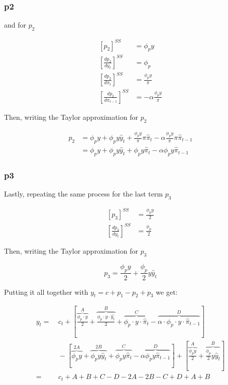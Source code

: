 \documentclass[11pt,preprint, authoryear]{elsarticle}
\numberwithin{equation}{section}
\numberwithin{figure}{section}
\numberwithin{table}{section}
\begin{document}
\hypertarget{p2}{%
\subsubsection{p2}\label{p2}}

and for \(p_{2}\)

\[\begin{aligned}
\left[ p_{2} \right]^{SS} &= \phi_{p} y
\\
\left[ \frac{dp_{2}}{dy_{t}} \right]^{SS} &= \phi_{p}
\\
\left[ \frac{dp_{2}}{d\pi_{t}} \right]^{SS} &= \frac{\phi_{p} y}{\pi}
\\
\left[ \frac{dp_{2}}{d\pi_{t-1}} \right]^{SS} &= - \alpha \frac{\phi_{p} y}{\pi}
\end{aligned}\]

Then, writing the Taylor approximation for \(p_{2}\)

\[\begin{aligned}
p_{2} &= \phi_{p} y + \phi_{p} y \hat{y}_{t} + \frac{\phi_{p} y}{\pi} \pi \hat{\pi}_{t} - \alpha \frac{\phi_{p} y}{\pi} \pi \hat{\pi}_{t-1}\\
&= \phi_{p} y + \phi_{p} y \hat{y}_{t} + \phi_{p} y \hat{\pi}_{t} - \alpha \phi_{p} y \hat{\pi}_{t-1}
\end{aligned}\]

\hypertarget{p3}{%
\subsubsection{p3}\label{p3}}

Lastly, repeating the same process for the last term \(p_{3}\)

\[\begin{aligned}
\left[ p_{3} \right]^{SS} &= \frac{\phi_{p} y} {2}\\\left[ \frac{dp_{3}}{dy_{t}} \right]^{SS} &= \frac{\phi_{p}}{2}
\end{aligned}\]

Then, writing the Taylor approximation for \(p_{3}\)

\[p_{3} = \frac{\phi_{p} y} {2} + \frac{\phi_{p}}{2}y \hat{y}_{t}\]

Putting it all together with \(y_{t} = c + p_{1} - p_{2} + p_{3}\) we
get:

\[\begin{aligned}
y_{t} = & \ c_t  +\left[ \overbrace{\frac{\phi_{p} \cdot y}{2}}^{A} + \overbrace{\frac{\phi_{p} \cdot y \cdot \hat{y_{t}} }{2}}^{B} + \overbrace{\phi_{p} \cdot y \cdot \hat{\pi}_{t}}^{C} - \overbrace{\alpha \cdot \phi_{p} \cdot y \cdot \hat{\pi}_{t-1}}^{D} \right] \\ & \ - \left[ \overbrace{\phi_{p} y}^{2A} + \overbrace{\phi_{p} y \hat{y}_{t}}^{2B} + \overbrace{ \phi_{p} y \hat{\pi}_{t}}^{C} - \overbrace{\alpha \phi_{p} y \hat{\pi}_{t-1}}^{D} \right] + \left[ \overbrace{\frac{\phi_{p} y} {2}}^{A} + \overbrace{\frac{\phi_{p}}{2}y \hat{y}_{t}}^{B} \right] \\= &\  c_{t} + A + B + C -D - 2A - 2B - C + D + A + B\\
\end{aligned}\]
\end{document}
